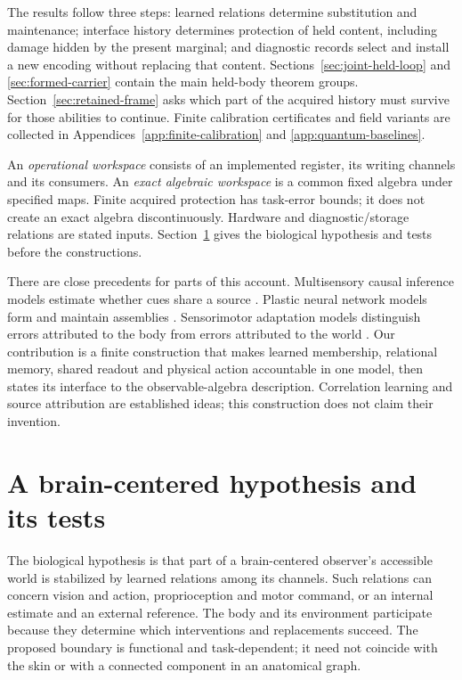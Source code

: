 \documentclass[11pt]{article}
\theoremstyle{definition}
\theoremstyle{remark}
\begin{document}
The results follow three steps: learned relations determine substitution and maintenance; interface history determines protection of held content, including damage hidden by the present marginal; and diagnostic records select and install a new encoding without replacing that content. Sections~\ref{sec:joint-held-loop} and \ref{sec:formed-carrier} contain the main held-body theorem groups. Section~\ref{sec:retained-frame} asks which part of the acquired history must survive for those abilities to continue. Finite calibration certificates and field variants are collected in Appendices~\ref{app:finite-calibration} and \ref{app:quantum-baselines}.

An \emph{operational workspace} consists of an implemented register, its writing channels and its consumers. An \emph{exact algebraic workspace} is a common fixed algebra under specified maps. Finite acquired protection has task-error bounds; it does not create an exact algebra discontinuously. Hardware and diagnostic/storage relations are stated inputs. Section~\ref{sec:biology} gives the biological hypothesis and tests before the constructions.

There are close precedents for parts of this account. Multisensory causal inference models estimate whether cues share a source \cite{Kording2007}. Plastic neural network models form and maintain assemblies \cite{LitwinKumar2014}. Sensorimotor adaptation models distinguish errors attributed to the body from errors attributed to the world \cite{Berniker2008}. Our contribution is a finite construction that makes learned membership, relational memory, shared readout and physical action accountable in one model, then states its interface to the observable-algebra description. Correlation learning and source attribution are established ideas; this construction does not claim their invention.

\section{A brain-centered hypothesis and its tests}
\label{sec:biology}

The biological hypothesis is that part of a brain-centered observer's accessible world is stabilized by learned relations among its channels. Such relations can concern vision and action, proprioception and motor command, or an internal estimate and an external reference. The body and its environment participate because they determine which interventions and replacements succeed. The proposed boundary is functional and task-dependent; it need not coincide with the skin or with a connected component in an anatomical graph.
\end{document}
